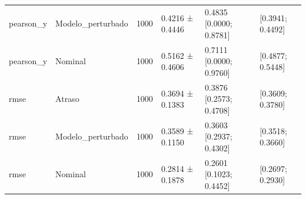 \begin{tabular}{llclll}
pearson_y & Modelo_perturbado & 1000 & 0.4216 ± 0.4446 & 0.4835 [0.0000; 0.8781] & [0.3941; 0.4492] \\
pearson_y & Nominal & 1000 & 0.5162 ± 0.4606 & 0.7111 [0.0000; 0.9760] & [0.4877; 0.5448] \\
rmse & Atraso & 1000 & 0.3694 ± 0.1383 & 0.3876 [0.2573; 0.4708] & [0.3609; 0.3780] \\
rmse & Modelo_perturbado & 1000 & 0.3589 ± 0.1150 & 0.3603 [0.2937; 0.4302] & [0.3518; 0.3660] \\
rmse & Nominal & 1000 & 0.2814 ± 0.1878 & 0.2601 [0.1023; 0.4452] & [0.2697; 0.2930] \\
\bottomrule
\end{tabular}
